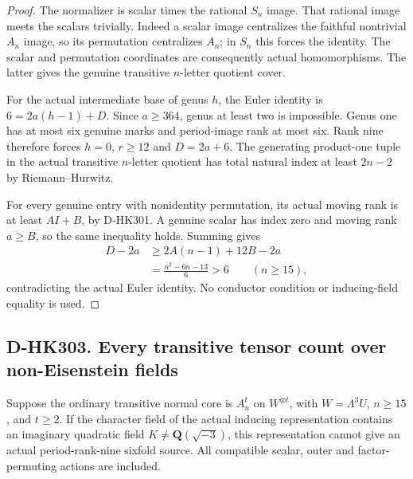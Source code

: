 \begin{proof}
The normalizer is scalar times the rational $S_n$ image.
That rational image meets the scalars trivially.  Indeed a
scalar image centralizes the faithful nontrivial $A_n$ image,
so its permutation centralizes $A_n$; in $S_n$ this forces
the identity.  The scalar and permutation coordinates
are consequently actual homomorphisms.  The latter gives
the genuine transitive $n$-letter quotient cover.

For the actual intermediate base of genus $h$, the Euler
identity is $6=2a(h-1)+D$.  Since $a\ge364$, genus at least
two is impossible.  Genus one has at most six genuine
marks and period-image rank at most six.  Rank nine
therefore forces $h=0$, $r\ge12$ and $D=2a+6$.
The generating product-one tuple in the actual transitive
$n$-letter quotient has total natural index at least
$2n-2$ by Riemann--Hurwitz.

For every genuine entry with nonidentity permutation,
its actual moving rank is at least $AI+B$, by D-HK301.
A genuine scalar has index zero and moving rank $a\ge B$,
so the same inequality holds.  Summing gives
\[
 \begin{split}
 D-2a&\ge2A(n-1)+12B-2a\\
     &=\frac{n^2-6n-13}{6}>6\qquad(n\ge15),
 \end{split}
 \tag{HK3.13}
\]
contradicting the actual Euler identity.
No conductor condition or inducing-field equality is used.
\end{proof}

\subsection*{D-HK303. Every transitive tensor count over non-Eisenstein fields}

\begin{theorem}[D-HK303]
Suppose the ordinary transitive normal core is $A_n^t$
on $W^{\otimes t}$, with $W=\Lambda^3U$, $n\ge15$,
and $t\ge2$.  If the character field of the actual
inducing representation contains an imaginary quadratic
field $K\ne\mathbf Q(\sqrt{-3})$, this representation
cannot give an actual period-rank-nine sixfold source.
All compatible scalar, outer and factor-permuting
actions are included.
\end{theorem}

